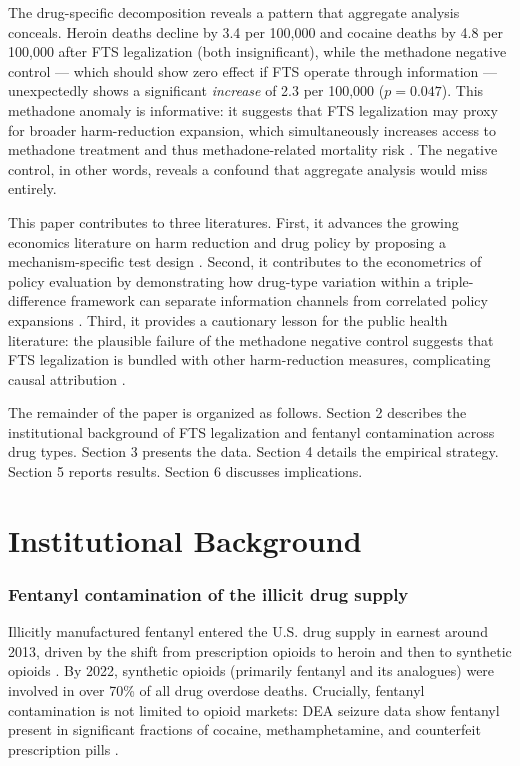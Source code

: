 \documentclass[12pt]{article}
\begin{document}
The drug-specific decomposition reveals a pattern that aggregate analysis conceals. Heroin deaths decline by 3.4 per 100,000 and cocaine deaths by 4.8 per 100,000 after FTS legalization (both insignificant), while the methadone negative control --- which should show zero effect if FTS operate through information --- unexpectedly shows a significant \textit{increase} of 2.3 per 100,000 ($p = 0.047$). This methadone anomaly is informative: it suggests that FTS legalization may proxy for broader harm-reduction expansion, which simultaneously increases access to methadone treatment and thus methadone-related mortality risk \citep{mattick2009}. The negative control, in other words, reveals a confound that aggregate analysis would miss entirely.

This paper contributes to three literatures. First, it advances the growing economics literature on harm reduction and drug policy by proposing a mechanism-specific test design \citep{doleac2020, dave2021, maclean2022}. Second, it contributes to the econometrics of policy evaluation by demonstrating how drug-type variation within a triple-difference framework can separate information channels from correlated policy expansions \citep{gruber1994, olden2022}. Third, it provides a cautionary lesson for the public health literature: the plausible failure of the methadone negative control suggests that FTS legalization is bundled with other harm-reduction measures, complicating causal attribution \citep{potier2014}.

The remainder of the paper is organized as follows. Section 2 describes the institutional background of FTS legalization and fentanyl contamination across drug types. Section 3 presents the data. Section 4 details the empirical strategy. Section 5 reports results. Section 6 discusses implications.

\section{Institutional Background}

\subsubsection*{Fentanyl contamination of the illicit drug supply}
Illicitly manufactured fentanyl entered the U.S. drug supply in earnest around 2013, driven by the shift from prescription opioids to heroin and then to synthetic opioids \citep{ciccarone2019}. By 2022, synthetic opioids (primarily fentanyl and its analogues) were involved in over 70\% of all drug overdose deaths. Crucially, fentanyl contamination is not limited to opioid markets: DEA seizure data show fentanyl present in significant fractions of cocaine, methamphetamine, and counterfeit prescription pills \citep{dea2023}.
\end{document}
